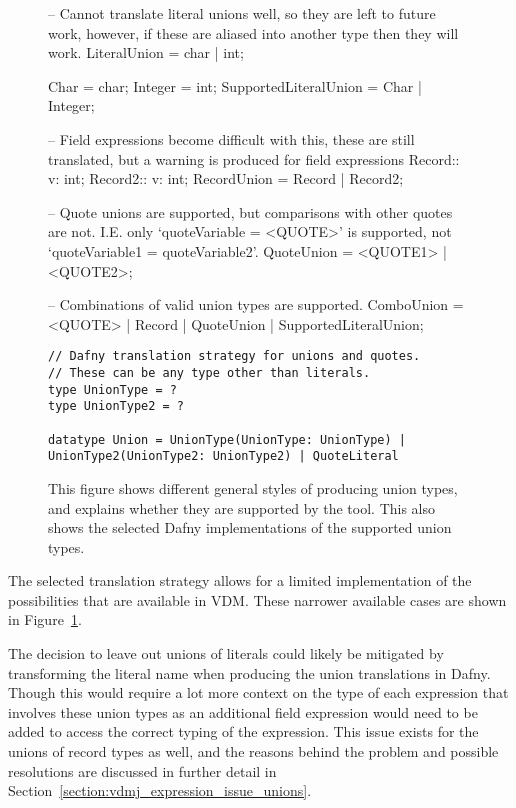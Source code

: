 \documentclass{entcs}
\begin{document}
\begin{figure}[h]
	\begin{center}
        \begin{vdmsl}
-- Cannot translate literal unions well, so they are left to future work, however, if these are aliased into another type then they will work.
LiteralUnion = char | int;

Char = char;
Integer = int;
SupportedLiteralUnion = Char | Integer;

-- Field expressions become difficult with this, these are still translated, but a warning is produced for field expressions
Record::     v: int;
Record2::    v: int;
RecordUnion = Record | Record2;

-- Quote unions are supported, but comparisons with other quotes are not. I.E. only `quoteVariable = <QUOTE>' is supported, not `quoteVariable1 = quoteVariable2'. 
QuoteUnion = <QUOTE1> | <QUOTE2>;

-- Combinations of valid union types are supported. 
ComboUnion = <QUOTE> | Record | QuoteUnion | SupportedLiteralUnion;
        \end{vdmsl}
\begin{lstlisting}[language=Dafny]
// Dafny translation strategy for unions and quotes.
// These can be any type other than literals.
type UnionType = ?
type UnionType2 = ?

datatype Union = UnionType(UnionType: UnionType) | UnionType2(UnionType2: UnionType2) | QuoteLiteral
\end{lstlisting}
        
		\caption{This figure shows different general styles of producing union types, and explains whether they are supported by the tool. This also shows the selected Dafny implementations of the supported union types.}\label{fig:vdm_failed_unions}
	\end{center}
\end{figure}

The selected translation strategy allows for a limited implementation of the possibilities that are available in VDM. These narrower available cases are shown in Figure~\ref{fig:vdm_failed_unions}. 

The decision to leave out unions of literals could likely be mitigated by transforming the literal name when producing the union translations in Dafny. Though this would require a lot more context on the type of each expression that involves these union types as an additional field expression would need to be added to access the correct typing of the expression. This issue exists for the unions of record types as well, and the reasons behind the problem and possible resolutions are discussed in further detail in Section~\ref{section:vdmj_expression_issue_unions}.
\end{document}
